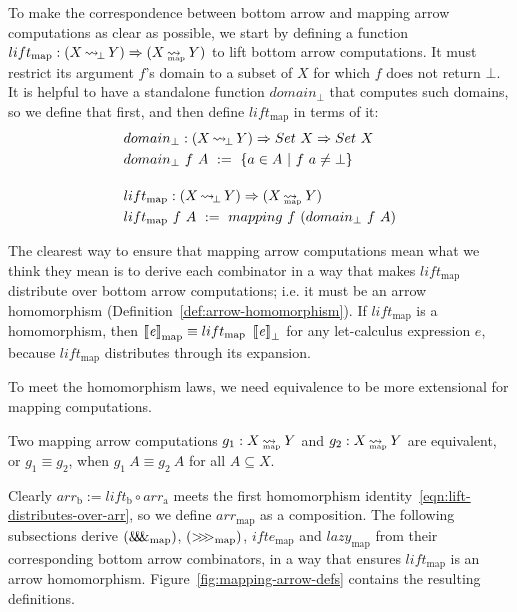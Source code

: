 \documentclass[preprint]{sigplanconf}
\newcommand{\arrow}{\rightsquigarrow}
\newcommand{\arrowlift}{\ensuremath{lift}}
\newcommand{\arrowarr}{\ensuremath{arr}}
\newcommand{\arrowcomp}{\ensuremath{{>}\mspace{-6mu}{>}\mspace{-6mu}{>}}}
\newcommand{\arrowpair}{\ensuremath{\mathit{\&\mspace{-7.5mu}\&\mspace{-7.5mu}\&}}}
\newcommand{\arrowif}{\ensuremath{ifte}}
\newcommand{\arrowlazy}{\ensuremath{lazy}}
\newcommand{\gen}{_\mathrm{a}}
\newcommand{\genb}{_\mathrm{b}}
\DeclareMathOperator{\botto}{\arrow_{\mspace{-3mu}\bot}}
\newcommand{\map}{_\mathrm{map}}
\DeclareMathOperator{\mapto}{\arrow_{\mspace{-21mu}\map}}
\newcommand{\liftmap}{\arrowlift\map}
\newcommand{\arrmap}{\arrowarr\map}
\newcommand{\compmap}{\arrowcomp\map}
\newcommand{\pairmap}{\arrowpair\map}
\newcommand{\ifmap}{\arrowif\map}
\newcommand{\lazymap}{\arrowlazy\map}
\begin{document}
To make the correspondence between bottom arrow and mapping arrow computations as clear as possible,
we start by defining a function $\liftmap : (X \botto Y) \tto (X \mapto Y)$ to lift bottom arrow computations.
It must restrict its argument $f$'s domain to a subset of $X$ for which $f$ does not return $\bot$.
It is helpful to have a standalone function $domain_\bot$ that computes such domains, so we define that first, and then define $\liftmap$ in terms of it:
\begin{align}
	&\begin{aligned}
		&domain_\bot : (X \botto Y) \tto Set~X \tto Set~X \\
		&domain_\bot~f~A \ := \ \setb{a \in A}{f~a \neq \bot}
	\end{aligned} \\
\nonumber \\[-6pt]
	&\begin{aligned}
		&\liftmap : (X \botto Y) \tto (X \mapto Y) \\
		&\liftmap~f~A \ := \ mapping~f~(domain_\bot~f~A)
	\end{aligned}
\end{align}

The clearest way to ensure that mapping arrow computations mean what we think they mean is to derive each combinator in a way that makes $\liftmap$ distribute over bottom arrow computations; i.e. it must be an arrow homomorphism (Definition~\ref{def:arrow-homomorphism}).
If $\liftmap$ is a homomorphism, then $\meaningof{\mathit{e}}\map \equiv \liftmap~\meaningof{\mathit{e}}_\bot$ for any let-calculus expression $\mathit{e}$, because $\liftmap$ distributes through its expansion.

To meet the homomorphism laws, we need equivalence to be more extensional for mapping computations.

\begin{definition}
Two mapping arrow computations $g_1 : X \mapto Y$ and $g_2 : X \mapto Y$ are equivalent, or $g_1 \equiv g_2$, when $g_1~A \equiv g_2~A$ for all $A \subseteq X$.
\end{definition}

Clearly $\arrowarr\genb := lift\genb \circ \arrowarr\gen$ meets the first homomorphism identity~\eqref{eqn:lift-distributes-over-arr}, so we define $\arrmap$ as a composition.
The following subsections derive $(\pairmap)$, $(\compmap)$, $\ifmap$ and $\lazymap$ from their corresponding bottom arrow combinators, in a way that ensures $\liftmap$ is an arrow homomorphism.
Figure~\ref{fig:mapping-arrow-defs} contains the resulting definitions.
\end{document}
